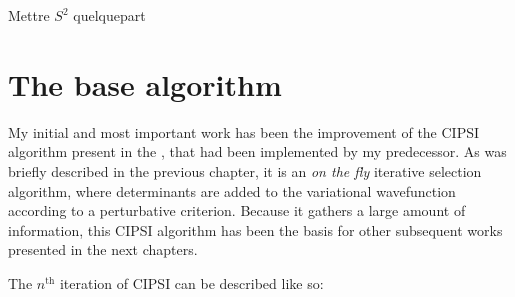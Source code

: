 \documentclass[./thesis.tex]{subfiles}
\begin{document}
\label{chap:CIPSI}


\alert{Mettre $S^2$ quelquepart}

\section{The base algorithm}
My initial and most important work has been the improvement of the CIPSI algorithm present in the \QP, that had been implemented by my predecessor.\cite{giner:tel-01077016} As was briefly described in the previous chapter, it is an \emph{on the fly} iterative selection algorithm, where determinants are added to the variational wavefunction according to a perturbative criterion. Because it gathers a large amount of information, this CIPSI algorithm has been the basis for other subsequent works presented in the next chapters.

The $n^\text{th}$ iteration of CIPSI can be described like so:
\end{document}
